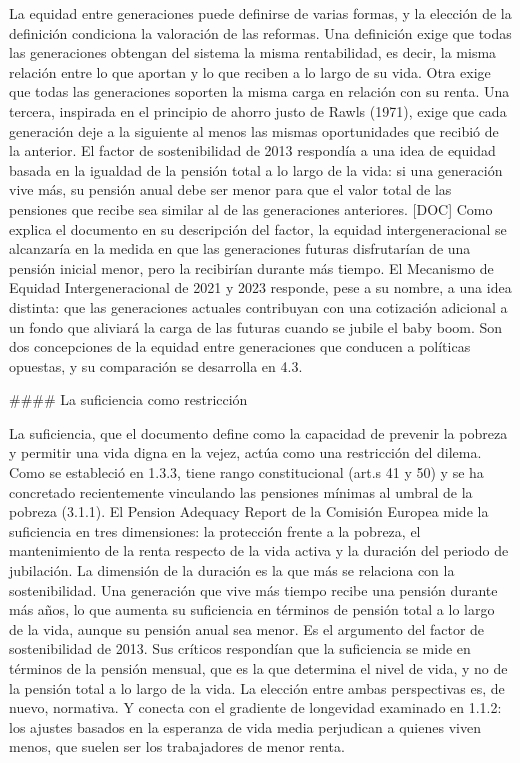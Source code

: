 \documentclass[10pt,a4paper]{article}
\begin{document}
La equidad entre generaciones puede definirse de varias formas, y la elección de la definición condiciona la valoración de las reformas. Una definición exige que todas las generaciones obtengan del sistema la misma rentabilidad, es decir, la misma relación entre lo que aportan y lo que reciben a lo largo de su vida. Otra exige que todas las generaciones soporten la misma carga en relación con su renta. Una tercera, inspirada en el principio de ahorro justo de Rawls (1971), exige que cada generación deje a la siguiente al menos las mismas oportunidades que recibió de la anterior. El factor de sostenibilidad de 2013 respondía a una idea de equidad basada en la igualdad de la pensión total a lo largo de la vida: si una generación vive más, su pensión anual debe ser menor para que el valor total de las pensiones que recibe sea similar al de las generaciones anteriores. [DOC] Como explica el documento en su descripción del factor, la equidad intergeneracional se alcanzaría en la medida en que las generaciones futuras disfrutarían de una pensión inicial menor, pero la recibirían durante más tiempo. El Mecanismo de Equidad Intergeneracional de 2021 y 2023 responde, pese a su nombre, a una idea distinta: que las generaciones actuales contribuyan con una cotización adicional a un fondo que aliviará la carga de las futuras cuando se jubile el baby boom. Son dos concepciones de la equidad entre generaciones que conducen a políticas opuestas, y su comparación se desarrolla en 4.3.

#### La suficiencia como restricción

La suficiencia, que el documento define como la capacidad de prevenir la pobreza y permitir una vida digna en la vejez, actúa como una restricción del dilema. Como se estableció en 1.3.3, tiene rango constitucional (art.s 41 y 50) y se ha concretado recientemente vinculando las pensiones mínimas al umbral de la pobreza (3.1.1). El Pension Adequacy Report de la Comisión Europea mide la suficiencia en tres dimensiones: la protección frente a la pobreza, el mantenimiento de la renta respecto de la vida activa y la duración del periodo de jubilación. La dimensión de la duración es la que más se relaciona con la sostenibilidad. Una generación que vive más tiempo recibe una pensión durante más años, lo que aumenta su suficiencia en términos de pensión total a lo largo de la vida, aunque su pensión anual sea menor. Es el argumento del factor de sostenibilidad de 2013. Sus críticos respondían que la suficiencia se mide en términos de la pensión mensual, que es la que determina el nivel de vida, y no de la pensión total a lo largo de la vida. La elección entre ambas perspectivas es, de nuevo, normativa. Y conecta con el gradiente de longevidad examinado en 1.1.2: los ajustes basados en la esperanza de vida media perjudican a quienes viven menos, que suelen ser los trabajadores de menor renta.
\end{document}
